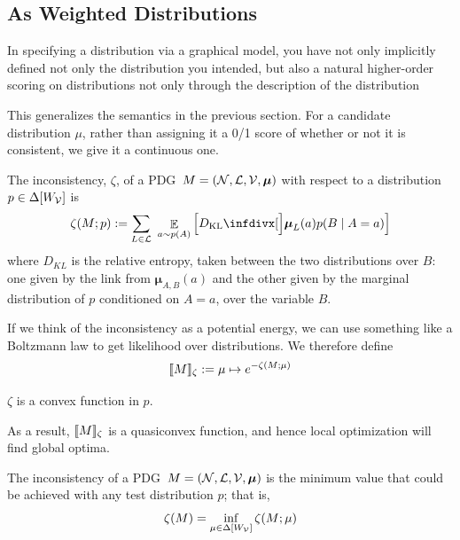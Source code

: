 \documentclass{article}
\newcommand\bmu{\boldsymbol{\mu}}
\newcommand{\MN}{PDG}
\begin{document}
	\subsection{As Weighted Distributions}
	
	
	
	In specifying a distribution via a graphical model, you have not only implicitly defined not only the distribution you intended, but also a natural higher-order scoring on distributions not only through the description of the distribution 
	
 	This generalizes the semantics in the previous section. For a candidate distribution $\mu$, rather than assigning it a 0/1 score of whether or not it is consistent, we give it a continuous one.

	\begin{defn}
		The inconsistency, $\zeta$, of a \MN\ $M = (\cal N, L, V, \bmu)$ with respect to a distribution $p \in \Delta[W_{\cal V}]$ is
		\[
			\zeta(M ; p) := %
			\sum_{L \in \cal L}~\mathop{\mathbb E}_{a \sim p(A)} \left[\kldiv[\Big]{\bmu_{L}(a) }{ p(B \mid A = a) } \right]
		\]
		where $D_{KL}$ is the relative entropy, taken between the two distributions over $B$: one given by the link from $\bmu_{A,B}(a)$ and the other given by the marginal distribution of $p$ conditioned on $A = a$, over the variable $B$.
	\end{defn}	
	
	If we think of the inconsistency as a potential energy, we can use something like a Boltzmann law to get likelihood over distributions. We therefore define	
	\[\llbracket M\rrbracket_\zeta := \mu \mapsto e^{-\zeta(M;\mu)}\]


	\begin{prop}[restate=thmzetaconvex]
		$\zeta$ is a convex function in $p$.
	\end{prop}
	As a result, $\llbracket M\rrbracket_\zeta$ is a quasiconvex function, and hence local optimization will find global optima.

	\begin{defn}
		The inconsistency of a \MN\ $M = (\cal N, L, V, \bmu)$ is the minimum value that could be achieved with any test distribution $p$; that is, 
		\[ \zeta(M) = \inf_{ \mu \in \Delta [W_{\cal V}]} \zeta (M; \mu) 
			 \]
		
	\end{defn}
\end{document}

